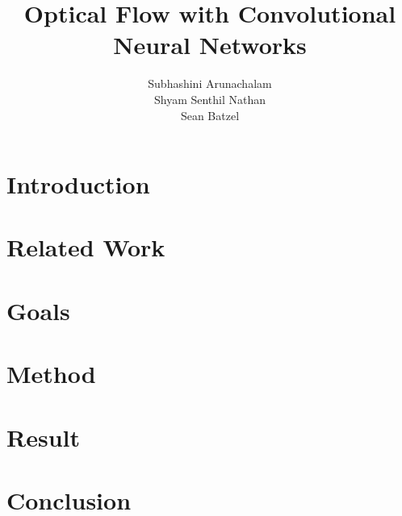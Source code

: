 \documentclass[]{article}
\title{Optical Flow with Convolutional Neural Networks}
\author{Subhashini Arunachalam\\Shyam Senthil Nathan\\Sean Batzel}
\begin{document}
\maketitle

\nocite{*}

\pagebreak
\begin{abstract}
\end{abstract}

\section{Introduction}

\section{Related Work}

\section{Goals}

\section{Method}

\section{Result}

\section{Conclusion}

\pagebreak
\listoftables
\listoffigures
\printbibliography[heading=bibintoc]{}
\end{document}
